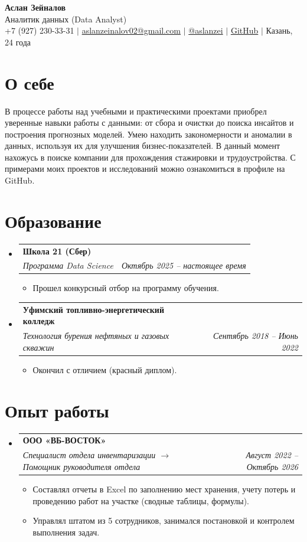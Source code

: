 \documentclass[letterpaper,11pt]{article}
\makeatletter
\newcommand{\resumeItem}[1]{
  \item\small{
    {#1 \vspace{-2pt}}
  }
}
\newcommand{\resumeSubheading}[4]{
  \vspace{-2pt}\item
    \begin{tabular*}{0.97\textwidth}[t]{l@{\extracolsep{\fill}}r}
      \textbf{#1} & #2 \\
      \textit{\small#3} & \textit{\small #4} \\
    \end{tabular*}\vspace{-7pt}
}
\newcommand{\resumeSubHeadingListStart}{\begin{itemize}[leftmargin=0.15in, label={}]}
\newcommand{\resumeSubHeadingListEnd}{\end{itemize}}
\newcommand{\resumeItemListStart}{\begin{itemize}}
\newcommand{\resumeItemListEnd}{\end{itemize}\vspace{-5pt}}
\makeatother
\begin{document}
\begin{center}
    \textbf{\Huge Аслан Зейналов} \\ \vspace{4pt}
    \small Аналитик данных (Data Analyst) \\ \vspace{4pt}
    \small +7 (927) 230-33-31 $|$ \href{mailto:aslanzeinalov02@gmail.com}{aslanzeinalov02@gmail.com} $|$ 
    \href{https://t.me/aslanzei}{@aslanzei} $|$
    \href{https://github.com/AslanZeinalov}{GitHub} $|$ Казань, 24 года
\end{center}

\section{О себе}
В процессе работы над учебными и практическими проектами приобрел уверенные навыки работы с данными: от сбора и очистки до поиска инсайтов и построения прогнозных моделей. Умею находить закономерности и аномалии в данных, используя их для улучшения бизнес-показателей. В данный момент нахожусь в поиске компании для прохождения стажировки и трудоустройства. С примерами моих проектов и исследований можно ознакомиться в профиле на GitHub.

\section{Образование}
  \resumeSubHeadingListStart
    \resumeSubheading
      {Школа 21 (Сбер)}
      {} %
      {Программа Data Science}
      {Октябрь 2025 -- настоящее время} %
      \resumeItemListStart
        \resumeItem{Прошел конкурсный отбор на программу обучения.}
      \resumeItemListEnd
      
    \resumeSubheading
      {Уфимский топливно-энергетический колледж}
      {} %
      {Технология бурения нефтяных и газовых скважин}
      {Сентябрь 2018 -- Июнь 2022}
      \resumeItemListStart
        \resumeItem{Окончил с отличием (красный диплом).}
      \resumeItemListEnd
  \resumeSubHeadingListEnd

\section{Опыт работы}
  \resumeSubHeadingListStart
    \resumeSubheading
      {ООО «ВБ-ВОСТОК»}
      {} %
      {Специалист отдела инвентаризации $\rightarrow$ Помощник руководителя отдела}
      {Август 2022 -- Октябрь 2026} %
      \resumeItemListStart
        \resumeItem{Составлял отчеты в Excel по заполнению мест хранения, учету потерь и проведению работ на участке (сводные таблицы, формулы).}
        \resumeItem{Управлял штатом из 5 сотрудников, занимался постановкой и контролем выполнения задач.}
      \resumeItemListEnd
  \resumeSubHeadingListEnd
\end{document}

